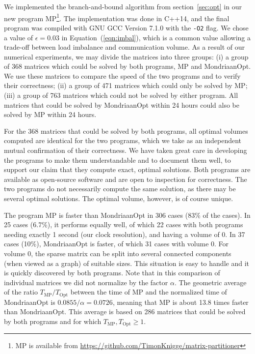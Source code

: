 We implemented the branch-and-bound algorithm from section~\ref{sec:opt} in our new program
MP\footnote{MP is available from \url{https://github.com/TimonKnigge/matrix-partitioner}}. The
implementation was done in C++14, and the final program was compiled with GNU GCC Version 7.1.0
with the \texttt{-O2} flag.
We chose a value of $\epsilon=0.03$ in Equation~(\ref{eqn:imbal}), which is a common value
allowing a trade-off between load imbalance and communication volume. 
As a result of our numerical experiments, we may divide the matrices into three groups: (i) a group of 368 matrices which could be solved
by both programs, MP and MondriaanOpt. We use these matrices to compare the speed of the two programs
and to verify their correctness; (ii) a group of 471 matrices which could only be solved by MP;
(iii) a group of 763 matrices which could not be solved by either program.
All matrices that could be solved by MondriaanOpt within 24 hours could also be solved by 
MP within 24 hours.

For the 368 matrices that could be solved by both programs, all optimal volumes computed are identical
for the two programs,
which we take as an independent mutual confirmation of their correctness. We have taken great care
in developing the programs to make them understandable and to document them well,
to support our claim that they compute exact, optimal solutions.
Both programs are available as open-source software
and are open to inspection for correctness.
The two programs do not necessarily compute the same solution, as there may be several
optimal solutions. The optimal volume, however, is of course unique.

The program MP is faster than MondriaanOpt in 306 cases (83\% of the cases).
In 25 cases (6.7\%), it performs equally well, of which 22 cases with both programs needing exactly
1 second (our clock resolution), and having a volume of 0.
In 37 cases (10\%), MondriaanOpt is faster, of which 31 cases with volume 0.
For volume 0, the sparse matrix can be split into several connected components
(when viewed as a graph) of suitable sizes. This situation is easy to handle
and it is quickly discovered by both programs. Note that in this comparison of individual matrices
we did not normalize by the factor $\alpha$.
The geometric average of the ratio $T_{\mathrm{MP}} / T_{\mathrm{Opt}}$
between the time of MP and the normalized time of MondriaanOpt is $0.0855 / \alpha = 0.0726$,
meaning that MP is about 13.8 times faster
than MondriaanOpt.
This average is based on 286 matrices that could be solved by both programs and for which $T_{\mathrm{MP}}, T_{\mathrm{Opt}}  \geq 1$.

